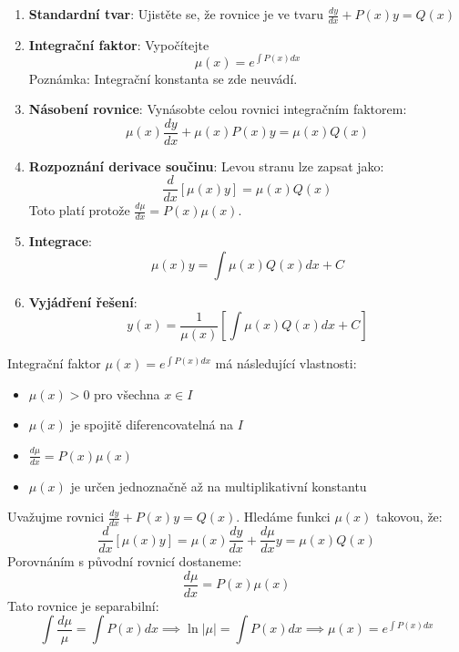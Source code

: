 \begin{method}
\label{met:integracni-faktor}
\begin{enumerate}
\item \textbf{Standardní tvar}: Ujistěte se, že rovnice je ve tvaru $\frac{dy}{dx} + P(x)y = Q(x)$

\item \textbf{Integrační faktor}: Vypočítejte
\[
\mu(x) = e^{\int P(x)  dx}
\]
Poznámka: Integrační konstanta se zde neuvádí.

\item \textbf{Násobení rovnice}: Vynásobte celou rovnici integračním faktorem:
\[
\mu(x)\frac{dy}{dx} + \mu(x)P(x)y = \mu(x)Q(x)
\]

\item \textbf{Rozpoznání derivace součinu}: Levou stranu lze zapsat jako:
\[
\frac{d}{dx}[\mu(x)y] = \mu(x)Q(x)
\]
Toto platí protože $\frac{d\mu}{dx} = P(x)\mu(x)$.

\item \textbf{Integrace}:
\[
\mu(x)y = \int \mu(x)Q(x)  dx + C
\]

\item \textbf{Vyjádření řešení}:
\[
y(x) = \frac{1}{\mu(x)} \left[\int \mu(x)Q(x)  dx + C\right]
\]
\end{enumerate}
\end{method}

\vspace{0.8\baselineskip}

\begin{theorem}
Integrační faktor $\mu(x) = e^{\int P(x)dx}$ má následující vlastnosti:
\begin{itemize}
\item $\mu(x) > 0$ pro všechna $x \in I$
\item $\mu(x)$ je spojitě diferencovatelná na $I$
\item $\frac{d\mu}{dx} = P(x)\mu(x)$
\item $\mu(x)$ je určen jednoznačně až na multiplikativní konstantu
\end{itemize}
\end{theorem}

\vspace{0.6\baselineskip}

\begin{example}
Uvažujme rovnici $\frac{dy}{dx} + P(x)y = Q(x)$. Hledáme funkci $\mu(x)$ takovou, že:
\[
\frac{d}{dx}[\mu(x)y] = \mu(x)\frac{dy}{dx} + \frac{d\mu}{dx}y = \mu(x)Q(x)
\]
Porovnáním s původní rovnicí dostaneme:
\[
\frac{d\mu}{dx} = P(x)\mu(x)
\]
Tato rovnice je separabilní:
\[
\int \frac{d\mu}{\mu} = \int P(x)dx \implies \ln|\mu| = \int P(x)dx \implies \mu(x) = e^{\int P(x)dx}
\]
\end{example}

